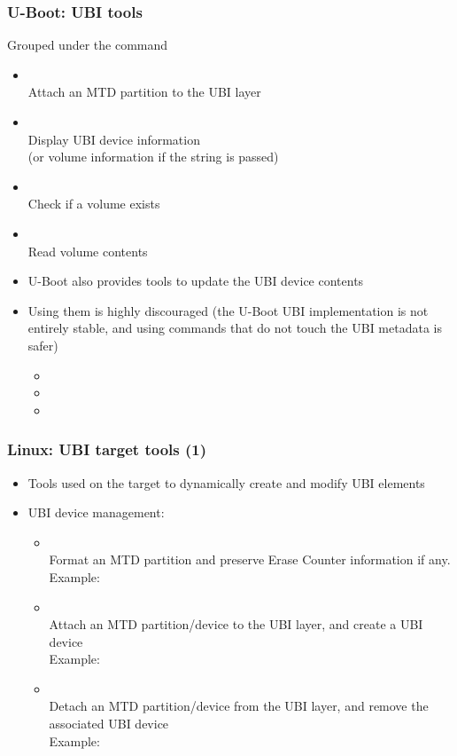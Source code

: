 \begin{frame}
  \frametitle{U-Boot: UBI tools}
  Grouped under the  command
    \begin{itemize}
    \item {}\\
	Attach an MTD partition to the UBI layer
    \item {}\\
	Display UBI device information\\
	(or volume information if the  string is passed)
    \item {}\\
	Check if a volume exists
    \item {}\\
	Read volume contents
    \item U-Boot also provides tools to update the UBI device contents
    \item Using them is highly discouraged (the U-Boot UBI implementation
      is not entirely stable, and using commands that do not touch the UBI
      metadata is safer)
      \begin{itemize}
      \item {}
      \item {}
      \item {}
      \end{itemize}
    \end{itemize}
\end{frame}

\begin{frame}
  \frametitle{Linux: UBI target tools (1)}
  \begin{itemize}
  \item Tools used on the target to dynamically create and modify
      UBI elements
  \item UBI device management:
    \begin{itemize}
    \item {}\\
	Format an MTD partition and preserve Erase Counter information if any.\\
	Example: 
    \item {}\\
	Attach an MTD partition/device to the UBI layer, and create a
        UBI device\\
        Example:  
    \item {}\\
	Detach an MTD partition/device from the UBI layer, and remove
        the associated UBI device\\
        Example: 
    \end{itemize}
  \end{itemize}
\end{frame}


